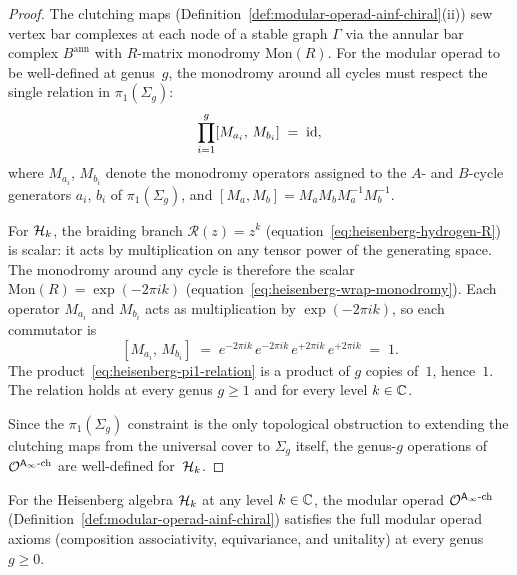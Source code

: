 \begin{proof}
The clutching maps
(Definition~\ref{def:modular-operad-ainf-chiral}(ii))
sew vertex bar complexes at each node of a stable graph
$\Gamma$ via the annular bar complex $B^{\mathrm{ann}}$
with $R$-matrix monodromy $\mathrm{Mon}(R)$.
For the modular operad to be well-defined at genus~$g$,
the monodromy around all cycles must respect the
single relation in $\pi_1(\Sigma_g)$:
\begin{equation}\label{eq:heisenberg-pi1-relation}
\prod_{i=1}^{g}
[M_{a_i},\, M_{b_i}]
\;=\; \mathrm{id},
\end{equation}
where $M_{a_i}$, $M_{b_i}$ denote the monodromy
operators assigned to the $A$- and $B$-cycle generators
$a_i$, $b_i$ of $\pi_1(\Sigma_g)$, and
$[M_a, M_b] = M_a M_b M_a^{-1} M_b^{-1}$.

For $\mathcal{H}_k$, the braiding branch
$\mathcal R(z)=z^k$
(equation~\eqref{eq:heisenberg-hydrogen-R})
is scalar: it acts by multiplication on any
tensor power of the generating space.
The monodromy around any cycle is therefore
the scalar
$\mathrm{Mon}(R) = \exp(-2\pi i k)$
(equation~\eqref{eq:heisenberg-wrap-monodromy}).
Each operator $M_{a_i}$ and $M_{b_i}$ acts as
multiplication by $\exp(-2\pi i k)$, so each
commutator is
\[
[M_{a_i},\, M_{b_i}]
\;=\;
e^{-2\pi ik}\, e^{-2\pi ik}\,
e^{+2\pi ik}\, e^{+2\pi ik}
\;=\; 1.
\]
The product~\eqref{eq:heisenberg-pi1-relation}
is a product of $g$ copies of~$1$, hence~$1$.
The relation holds at every genus $g \ge 1$ and for
every level $k \in \mathbb{C}$.

Since the $\pi_1(\Sigma_g)$ constraint is
the only topological obstruction to extending
the clutching maps from the universal cover to
$\Sigma_g$ itself, the genus-$g$ operations of
$\mathcal{O}^{\mathsf{A}_{\infty}\text{-ch}}$ are well-defined
for~$\mathcal{H}_k$.
\end{proof}

\begin{proposition}
\label{prop:heisenberg-full-modular-operad}
For the Heisenberg algebra $\mathcal{H}_k$ at any level
$k \in \mathbb{C}$, the modular operad
$\mathcal{O}^{\mathsf{A}_{\infty}\textup{-ch}}$
\textup{(}Definition~\textup{\ref{def:modular-operad-ainf-chiral}}\textup{)}
satisfies the full modular operad axioms (composition
associativity, equivariance, and unitality) at every
genus $g \ge 0$.
\end{proposition}

